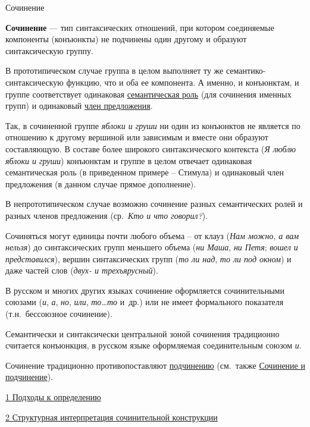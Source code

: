 Сочинение

\textbf{Сочинение} --- тип синтаксических отношений, при котором
соединяемые компоненты (конъюнкты) не подчинены один другому и образуют
синтаксическую группу.

В прототипическом случае группа в целом выполняет ту же
семантико-синтаксическую функцию, что и оба ее компонента. А именно, и
конъюнктам, и группе соответствует одинаковая \underline{семантическая
роль} (для сочинения именных групп) и одинаковый \underline{член
предложения}.

Так, в сочиненной группе \emph{яблоки и груши} ни один из конъюнктов не
является по отношению к другому вершиной или зависимым и вместе они
образуют составляющую. В составе более широкого синтаксического
контекста (\emph{Я люблю яблоки и груши}) конъюнктам и группе в целом
отвечает одинаковая семантическая роль (в приведенном примере --
Стимула) и одинаковый член предложения (в данном случае прямое
дополнение).

В непрототипическом случае возможно сочинение разных семантических ролей
и разных членов предложения (ср.~\emph{Кто и что говорил?}).

Сочиняться могут единицы почти любого объема -- от клауз (\emph{Нам
можно}, \emph{а вам нельзя}) до синтаксических групп меньшего объема
(\emph{ни Маша}, \emph{ни Петя}; \emph{вошел и представился}), вершин
синтаксических групп (\emph{то ли над}, \emph{то ли под окном}) и даже
частей слов (\emph{двух- и трехъярусный}).

В русском и многих других языках сочинение оформляется сочинительными
союзами (\emph{и}, \emph{а}, \emph{но}, \emph{или}, \emph{то\ldots то}
и~др.) или не имеет формального показателя (т.н.~бессоюзное сочинение).

Семантически и синтаксически центральной зоной сочинения традиционно
считается конъюнкция, в русском языке оформляемая соединительным союзом
\emph{и}.

Сочинение традиционно противопоставляют \underline{подчинению}
(см.~также \underline{Сочинение и подчинение}).

\protect\hyperlink{ux43fux43eux434ux445ux43eux434ux44b-ux43a-ux43eux43fux440ux435ux434ux435ux43bux435ux43dux438ux44e}{1
Подходы к определению}

\protect\hyperlink{ux441ux442ux440ux443ux43aux442ux443ux440ux43dux430ux44f-ux438ux43dux442ux435ux440ux43fux440ux435ux442ux430ux446ux438ux44f-ux441ux43eux447ux438ux43dux438ux442ux435ux43bux44cux43dux43eux439-ux43aux43eux43dux441ux442ux440ux443ux43aux446ux438ux438}{2
Структурная интерпретация сочинительной конструкции}

